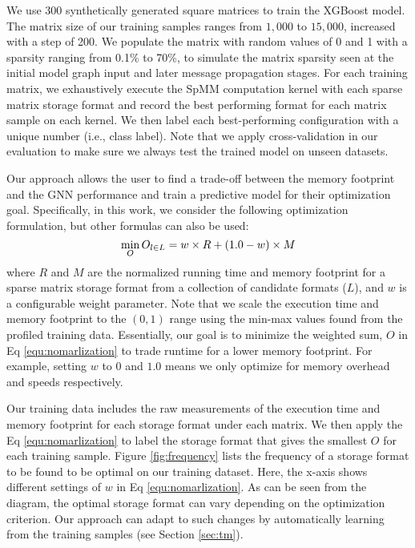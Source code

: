 We use 300 synthetically generated square matrices to train the XGBoost model. The matrix size of our training samples ranges from $1,000$
to $15,000$, increased with a step of 200. We populate the matrix with random values of 0 and 1 with a sparsity ranging from 0.1\% to 70\%,
to simulate the matrix sparsity seen at the initial model graph input and later message propagation stages.
For each training matrix, we exhaustively execute the
SpMM computation kernel with each sparse matrix storage format and record the best performing format for each matrix sample on each kernel. We then label each best-performing configuration with a unique number (i.e., class label). Note that we apply cross-validation in our evaluation to make sure we always test the trained model on unseen datasets.

 Our approach allows the user to find a trade-off between the memory footprint and the GNN performance and
train a predictive model for their optimization goal. Specifically, in this work, we consider the following optimization formulation,
but other formulas can also be used:
\begin{equation}
\small
\min_{O} O_{l \in L} = w \times R + (1.0 - w) \times M
\label{equ:nomarlization}
\end{equation}
where $R$ and $M$ are the normalized running time and memory footprint for a sparse matrix storage format from a collection of candidate
formats ($L$), and $w$ is a configurable weight parameter. Note that we scale the execution time and memory footprint to the $(0,1)$ range
using the min-max values found from the profiled training data. Essentially, our goal is to minimize the weighted sum, $O$ in
Eq \ref{equ:nomarlization} to trade runtime for a lower memory footprint. For example, setting $w$ to $0$ and $1.0$ means we only optimize for memory overhead and speeds respectively.

Our training data includes the raw measurements of the execution time and memory footprint for each storage format under each matrix. We then apply the Eq \ref{equ:nomarlization} to label the storage format that gives the smallest $O$ for each training
sample. Figure \ref{fig:frequency} lists the frequency of a storage format to be found to be optimal on our training dataset. Here, the x-axis shows different settings of $w$ in Eq \ref{equ:nomarlization}. As can be seen from the diagram, the optimal storage format can vary depending on the optimization criterion. Our approach can adapt to such changes by automatically learning from the training samples (see Section \ref{sec:tm}).

